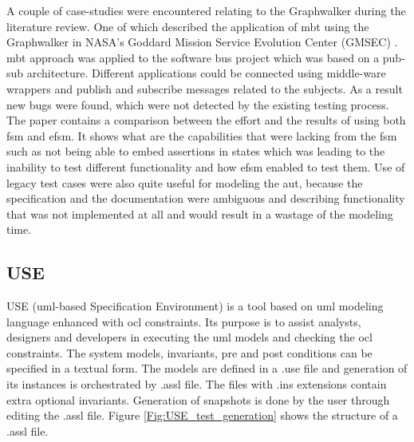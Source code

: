 \par
A couple of case-studies were encountered relating to the Graphwalker during the literature review. One of which described the application of \acrshort{mbt} using the Graphwalker in NASA's Goddard Mission Service Evolution Center (GMSEC) \cite{GMSEC}. \acrshort{mbt} approach was applied to the software bus project which was based on a pub-sub architecture. Different applications could be connected using middle-ware wrappers and publish and subscribe messages related to the subjects. As a result new bugs were found, which were not detected by the existing testing process. The paper contains a comparison between the effort and the results of using both \acrshort{fsm} and \acrshort{efsm}. It shows what are the capabilities that were lacking from the \acrshort{fsm} such as not being able to embed assertions in states which was leading to the inability to test different functionality and how \acrshort{efsm} enabled to test them. Use of legacy test cases were also quite useful for modeling the \acrshort{aut}, because the specification and the documentation were ambiguous and describing functionality that was not implemented at all and would result in a wastage of the modeling time.

\subsection{USE}
\par
USE (\acrshort{uml}-based Specification Environment) \cite{USE_definition} is a tool based on \acrshort{uml} modeling language enhanced with \acrshort{ocl} constraints. Its purpose is to assist analysts, designers and developers in executing the \acrshort{uml} models and checking the \acrshort{ocl} constraints. The system models, invariants,  pre and post conditions can be specified in a textual form. The models are defined in a .use file and generation of its instances is orchestrated by .assl file. The files with .ins extensions contain extra optional invariants. Generation of snapshots is done by the user through editing the .assl file. Figure \ref{Fig:USE_test_generation} shows the structure of a .assl file.

